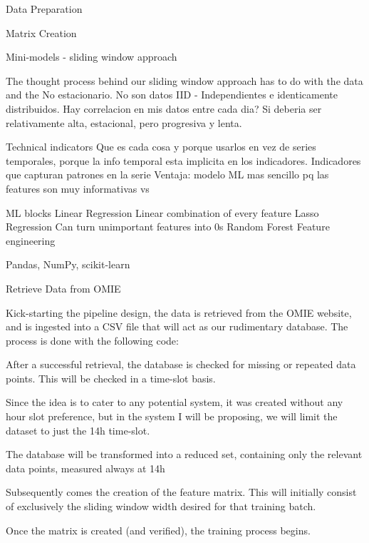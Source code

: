 \documentclass[12pt]{report} %
\begin{document}



Data Preparation

Matrix Creation

Mini-models - sliding window approach

The thought process behind our sliding window approach has to do with the data and the
No estacionario. No son datos IID - Independientes e identicamente distribuidos.
Hay correlacion en mis datos entre cada dia? Si deberia ser relativamente alta, estacional, pero progresiva y lenta.

Technical indicators
Que es cada cosa y porque usarlos en vez de series temporales, porque la info temporal esta implicita en los indicadores.
Indicadores que capturan patrones en la serie
Ventaja: modelo ML mas sencillo pq las features son muy informativas vs

ML blocks
    Linear Regression
        Linear combination of every feature
    Lasso Regression
        Can turn unimportant features into 0s
    Random Forest
        Feature engineering

Pandas, NumPy, scikit-learn


Retrieve Data from OMIE

Kick-starting the pipeline design, the data is retrieved from the OMIE website, and is ingested into a CSV file that will act as our rudimentary database. The process is done with the following code:

After a successful retrieval, the database is checked for missing or repeated data points. This will be checked in a time-slot basis.

Since the idea is to cater to any potential system, it was created without any hour slot preference, but in the system I will be proposing, we will limit the dataset to just the 14h time-slot.

The database will be transformed into a reduced set, containing only the relevant data points, measured always at 14h

Subsequently comes the creation of the feature matrix. This will initially consist of exclusively the sliding window width desired for that training batch.

Once the matrix is created (and verified), the training process begins.
\end{document}
